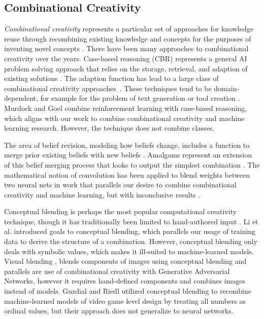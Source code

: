 \documentclass[letterpaper]{article}
\begin{document}
\subsection{Combinational Creativity}

\textit{Combinational creativity} represents a particular set of approaches for knowledge reuse through recombining existing knowledge and concepts for the purposes of inventing novel concepts \cite{boden2004creative}. There have been many approaches to combinational creativity over the years. Case-based reasoning (CBR) represents a general AI problem solving approach that relies on the storage, retrieval, and adaption of existing solutions \cite{de2005retrieval}. The adaption function has lead to a large class of combinational creativity approaches~\cite{wilke1998techniques,fox2009exploring,manzano2011amalgam}. These techniques tend to be domain-dependent, for example for the problem of text generation or tool creation \cite{hervas2006case,sizov2015evidence}. Murdock and Goel  combine reinforcement learning with case-based reasoning, which aligns with our work to combine combinational creativity and machine learning research. However, the technique does not combine classes.

The area of belief revision, modeling how beliefs change, includes a function to merge prior existing beliefs with new beliefs \cite{cojan2009belief,konieczny2011logic,fox2009exploring}. Amalgams represent an extension of this belief merging process that looks to output the simplest combination \cite{ontanon2010amalgams}. The mathematical notion of convolution has been applied to blend weights between two neural nets in work that parallels our desire to combine combinational creativity and machine learning, but with inconclusive results \cite{thagard2011aha}. 

Conceptual blending is perhaps the most popular computational creativity technique, though it has traditionally been limited to hand-authored input \cite{fauconnier2001conceptual}. Li et al.  introduced goals to conceptual blending, which parallels our usage of training data to derive the structure of a combination. However, conceptual blending only deals with symbolic values, which makes it ill-suited to machine-learned models. Visual blending \cite{cunha2017pig}, blends components of images using conceptual blending and parallels are use of combinational creativity with Generative Adversarial Networks, however it requires hand-defined components and combines images instead of models. Guzdial and Riedl  utilized conceptual blending to recombine machine-learned models of video game level design by treating all numbers as ordinal values, but their approach does not generalize to neural networks.
\end{document}
